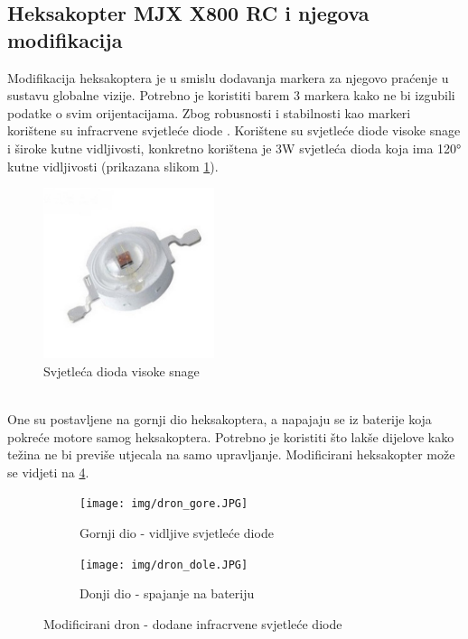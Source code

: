 \documentclass[times, utf8, diplomski]{fer}
\begin{document}
\subsection{Heksakopter MJX X800 RC i njegova modifikacija}\label{sec:heksakopter}
Modifikacija heksakoptera je u smislu dodavanja markera za njegovo praćenje u sustavu globalne vizije. Potrebno je koristiti barem 3 markera kako ne bi izgubili podatke o svim orijentacijama. Zbog robusnosti i stabilnosti kao markeri korištene su infracrvene  svjetleće diode . Korištene su svjetleće diode visoke snage i široke kutne vidljivosti, konkretno korištena je 3W svjetleća dioda koja ima \ang{120} kutne vidljivosti (prikazana slikom \ref{fig:LED}). \\
\begin{figure}[htb]
\centering
\includegraphics[width=5cm]{img/LED.png}
\caption{Svjetleća dioda visoke snage\protect\footnotemark}
\label{fig:LED}
\end{figure}
\\
One su postavljene na gornji dio heksakoptera, a napajaju se iz baterije koja pokreće motore samog heksakoptera. Potrebno je koristiti što lakše dijelove kako težina ne bi previše utjecala na samo upravljanje. Modificirani heksakopter može se vidjeti na \ref{fig:modificirani dron}.
\begin{figure}[htb]
\centering
\begin{subfigure}{.48\textwidth}
  \centering
  \texttt{[image: img/dron\_gore.JPG]}
  \caption{Gornji dio - vidljive svjetleće diode}
  \label{fig:gornji}
\end{subfigure}
\begin{subfigure}{.48\textwidth}
  \centering
  \texttt{[image: img/dron\_dole.JPG]}
  \caption{Donji dio - spajanje na bateriju}
  \label{fig:donji}
\end{subfigure}
\caption{Modificirani dron - dodane infracrvene svjetleće diode}
\label{fig:modificirani dron}
\end{figure}
\end{document}
